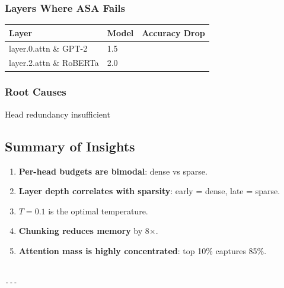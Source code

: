 \subsubsection{Layers Where ASA Fails}

\begin{table}[H]
\centering
\small
\begin{tabular}{lll}
\toprule
\textbf{Layer} & \textbf{Model} & \textbf{Accuracy Drop} \\
\midrule
layer.0.attn \& GPT-2 & 1.5 \\
layer.2.attn \& RoBERTa & 2.0 \\
\bottomrule
\end{tabular}
\end{table}

\subsubsection{Root Causes}

Head redundancy insufficient

\subsection{Summary of Insights}

\begin{enumerate}
\item \textbf{Per-head budgets are bimodal}: dense vs sparse.
\item \textbf{Layer depth correlates with sparsity}: early = dense, late = sparse.
\item \textbf{$T = 0.1$} is the optimal temperature.
\item \textbf{Chunking reduces memory} by 8$\times$.
\item \textbf{Attention mass is highly concentrated}: top 10\% captures 85\%.
\end{enumerate}
\begin{lstlisting}

---
\end{lstlisting}